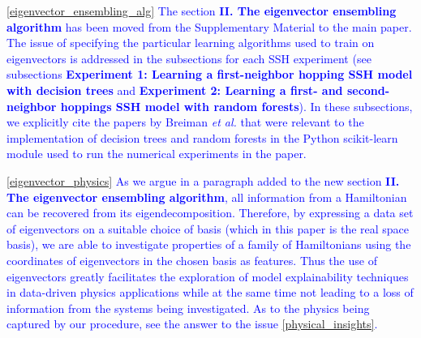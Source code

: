 \documentclass[10pt]{revtex4-1}
\newcommand{\citequote}[1]{\ref{#1}}
\begin{document}
\vspace{0.25cm}
\textcolor{blue}{\citequote{eigenvector_ensembling_alg}  The section \textbf{II. The eigenvector ensembling algorithm} has been moved from the Supplementary Material to the main paper. The issue of specifying the particular learning algorithms used to train on eigenvectors is addressed in the subsections for each SSH experiment (see subsections \textbf{Experiment 1: Learning a first-neighbor hopping SSH model with decision trees} and \textbf{Experiment 2: Learning a first- and second-neighbor hoppings SSH model with random forests}). In these subsections, we explicitly cite the papers by Breiman \emph{et al.} that were relevant to the implementation of decision trees and random forests in the Python scikit-learn module used to run the numerical experiments in the paper.}

\textcolor{blue}{\citequote{eigenvector_physics} As we argue in a paragraph added to the new section \textbf{II. The eigenvector ensembling algorithm},  all information from a Hamiltonian can be recovered from its eigendecomposition. Therefore, by expressing a data set of eigenvectors on a suitable choice of basis (which in this paper is the real space basis), we are able to investigate properties of a family of Hamiltonians using the coordinates of eigenvectors in the chosen basis as features. Thus the use of eigenvectors greatly facilitates the exploration of model explainability techniques in data-driven physics applications while at the same time not leading to a loss of information from the systems being investigated. As to the physics being captured by our procedure, see the answer to the issue \citequote{physical_insights}.} 

\end{document}
